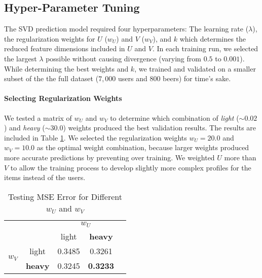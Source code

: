\documentclass[12pt]{article}
\begin{document}
\subsection*{Hyper-Parameter Tuning}
The SVD prediction model required four hyperparameters: The learning rate ($\lambda$), the regularization weights for $U$ ($w_U$) and $V$ ($w_V$), and $k$ which determines the reduced feature dimensions included in $U$ and $V$. In each training run, we selected the largest $\lambda$ possible without causing divergence (varying from $0.5$ to $0.001$). While determining the best weights and $k$, we trained and validated on a smaller subset of the the full dataset ($7,000$ users and $800$ beers) for time's sake.

\paragraph{Selecting Regularization Weights} We tested a matrix of $w_U$ and $w_V$ to determine which combination of \textit{light} ($\sim 0.02$) and \textit{heavy} ($\sim 30.0$) weights produced the best validation results. The results are included in Table \ref{tab:weight_table}. We selected the regularization weights $w_U = 20.0$ and $w_V = 10.0$ as the optimal weight combination, because larger weights produced more accurate predictions by preventing over training. We weighted $U$ more than $V$ to allow the training process to develop slightly more complex profiles for the items instead of the users. 

\begin{table}[ht!]
\centering
\caption{Testing MSE Error for Different $w_U$ and $w_V$}
\label{tab:weight_table}
\begin{tabular}{lcccl}
                                           & \multicolumn{1}{l}{}       & \multicolumn{2}{c}{$w_U$}                                &  \\ \cline{3-4}
                                           & \multicolumn{1}{c|}{}      & \multicolumn{1}{c|}{light} & \multicolumn{1}{c|}{\textbf{heavy}} &  \\ \cline{2-4}
\multicolumn{1}{l|}{\multirow{2}{*}{$w_V$}} & \multicolumn{1}{c|}{light} & 0.3485                     & 0.3261                     &  \\ \cline{2-2}
\multicolumn{1}{l|}{}                      & \multicolumn{1}{c|}{\textbf{heavy}} & 0.3245                     & \textbf{0.3233}                      &  \\ \cline{2-2}
\end{tabular}
\end{table}
\end{document}
